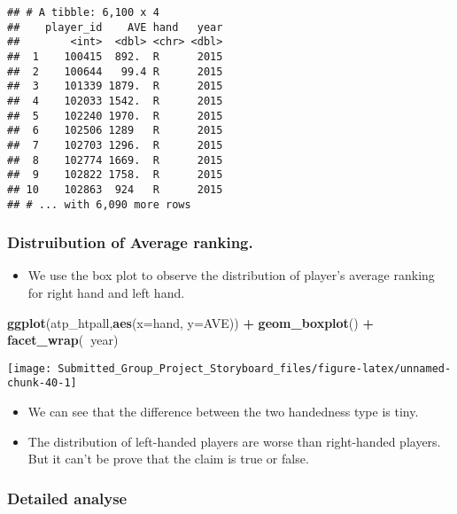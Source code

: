 \documentclass[]{article}
\newenvironment{Shaded}{\begin{snugshade}}{\end{snugshade}}
\newcommand{\KeywordTok}[1]{\textcolor[rgb]{0.13,0.29,0.53}{\textbf{#1}}}
\newcommand{\DataTypeTok}[1]{\textcolor[rgb]{0.13,0.29,0.53}{#1}}
\newcommand{\StringTok}[1]{\textcolor[rgb]{0.31,0.60,0.02}{#1}}
\newcommand{\OperatorTok}[1]{\textcolor[rgb]{0.81,0.36,0.00}{\textbf{#1}}}
\newcommand{\NormalTok}[1]{#1}
\providecommand{\tightlist}{%
  \setlength{\itemsep}{0pt}\setlength{\parskip}{0pt}}
\begin{document}
\begin{verbatim}
## # A tibble: 6,100 x 4
##    player_id    AVE hand   year
##        <int>  <dbl> <chr> <dbl>
##  1    100415  892.  R      2015
##  2    100644   99.4 R      2015
##  3    101339 1879.  R      2015
##  4    102033 1542.  R      2015
##  5    102240 1970.  R      2015
##  6    102506 1289   R      2015
##  7    102703 1296.  R      2015
##  8    102774 1669.  R      2015
##  9    102822 1758.  R      2015
## 10    102863  924   R      2015
## # ... with 6,090 more rows
\end{verbatim}

\subsubsection{Distruibution of Average
ranking.}\label{distruibution-of-average-ranking.}

\begin{itemize}
\tightlist
\item
  We use the box plot to observe the distribution of player's average
  ranking for right hand and left hand.
\end{itemize}

\begin{Shaded}
\begin{Highlighting}[]
\KeywordTok{ggplot}\NormalTok{(atp_htpall,}\KeywordTok{aes}\NormalTok{(}\DataTypeTok{x=}\NormalTok{hand, }\DataTypeTok{y=}\NormalTok{AVE)) }\OperatorTok{+}\StringTok{ }
\StringTok{  }\KeywordTok{geom_boxplot}\NormalTok{() }\OperatorTok{+}
\StringTok{  }\KeywordTok{facet_wrap}\NormalTok{(}\OperatorTok{~}\NormalTok{year)}
\end{Highlighting}
\end{Shaded}

\begin{center}\texttt{[image: Submitted\_Group\_Project\_Storyboard\_files/figure-latex/unnamed-chunk-40-1]} \end{center}

\begin{itemize}
\tightlist
\item
  We can see that the difference between the two handedness type is
  tiny.
\item
  The distribution of left-handed players are worse than right-handed
  players. But it can't be prove that the claim is true or false.
\end{itemize}

\subsubsection{Detailed analyse}\label{detailed-analyse}
\end{document}
